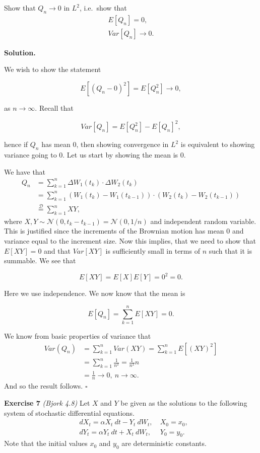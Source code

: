 \documentclass[a4paper,12pt,openany]{book}
\begin{document}
Show that \(Q_n\to 0\) in \(L^2\), i.e.~show that
\begin{align*}
E[Q_n]=0,\\
Var[Q_n]\to 0.
\end{align*}

\textbf{Solution.}

We wish to show the statement

\[
E[(Q_n-0)^2]=E[Q_n^2]\to 0,
\]

as \(n\to \infty\). Recall that

\[
Var[Q_n]=E[Q_n^2]-E[Q_n]^2,
\]

hence if \(Q_n\) has mean 0, then showing convergence in \(L^2\) is equivalent to showing variance going to 0. Let us start by showing the mean is 0.

We have that
\begin{align*}
Q_n&=\sum_{k=1}^n \Delta W_1(t_k)\cdot \Delta W_2(t_k)\\
&=\sum_{k=1}^n(W_1(t_k)-W_1(t_{k-1}))\cdot (W_2(t_k)-W_2(t_{k-1}))\\
&\stackrel{\mathcal{D}}{=}\sum_{k=1}^nXY,
\end{align*}
where \(X,Y\sim\mathcal{N}(0,t_k-t_{k-1})=\mathcal{N}(0,1/n)\) and independent random variable. This is justified since the increments of the Brownian motion has mean 0 and variance equal to the increment size. Now this implies, that we need to show that \(E[XY]=0\) and that \(Var[XY]\) is sufficiently small in terms of \(n\) such that it is summable. We see that

\[
E[XY]=E[X]E[Y]=0^2=0.
\]

Here we use independence. We now know that the mean is

\[
E[Q_n]=\sum_{k=1}^nE[XY]=0.
\]

We know from basic properties of variance that
\begin{align*}
Var(Q_n)&=\sum_{k=1}^n Var(XY)=\sum_{k=1}^n E[(XY)^2]\\
&=\sum_{k=1}^n\frac{1}{n^2}=\frac{1}{n^2}n\\
&=\frac{1}{n}\to0,\ n\to\infty.
\end{align*}
And so the result follows. \(\square\)

\textbf{Exercise 7} \emph{(Bjork 4.8)} Let \(X\) and \(Y\) be given as the solutions to the following system of stochastic differential equations.
\begin{align*}
&dX_t=\alpha X_t\ dt-Y_t\ dW_t,\ &X_0=x_0,\\
&dY_t=\alpha Y_t\ dt + X_t\ dW_t,\ &Y_0=y_0.
\end{align*}
Note that the initial values \(x_0\) and \(y_0\) are deterministic constants.
\end{document}
